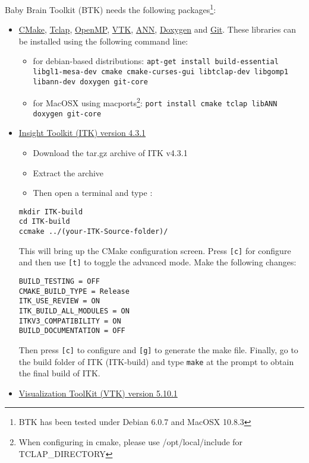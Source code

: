 \documentclass[a4paper,10pt]{article}
\begin{document}
Baby Brain Toolkit (BTK) needs the following packages\footnote{BTK has been tested under Debian 6.0.7 and MacOSX 10.8.3}:
\begin{itemize}
 \item \href{http://www.cmake.org}{CMake}, \href{http://tclap.sourceforge.net}{Tclap}, \href{http://openmp.org}{OpenMP}, \href{http://www.vtk.org}{VTK}, \href{http://www.cs.umd.edu/\string~mount/ANN}{ANN}, \href{http://www.doxygen.org}{Doxygen} and \href{http://git-scm.com/}{Git}. These libraries can be installed using the following command line:
 \begin{itemize}
 \item for debian-based distributions: \texttt{apt-get install build-essential libgl1-mesa-dev cmake cmake-curses-gui libtclap-dev libgomp1 libann-dev  doxygen git-core}
 \item for MacOSX using macports\footnote{When configuring in cmake, please use /opt/local/include for TCLAP\_DIRECTORY}: \texttt{port install cmake tclap libANN doxygen git-core}
 \end{itemize}
 \item \href{http://www.itk.org/ITK/resources/software.html}{Insight Toolkit (ITK) version 4.3.1}
 \begin{itemize}
 \item Download the tar.gz archive of ITK v4.3.1
 \item Extract the archive 
 \item Then open a terminal and type :
 \end{itemize}
\begin{verbatim}
mkdir ITK-build
cd ITK-build
ccmake ../(your-ITK-Source-folder)/
\end{verbatim}
This will bring up the CMake configuration screen. Press \texttt{[c]} for
configure and then use \texttt{[t]} to toggle the advanced mode. Make the
following changes:
\begin{verbatim}
BUILD_TESTING = OFF
CMAKE_BUILD_TYPE = Release
ITK_USE_REVIEW = ON
ITK_BUILD_ALL_MODULES = ON
ITKV3_COMPATIBILITY = ON
BUILD_DOCUMENTATION = OFF
\end{verbatim}
Then press \texttt{[c]} to configure and \texttt{[g]} to generate the make file.
Finally, go to the build folder of ITK (ITK-build) and type \texttt{make} at the prompt to obtain the final build of ITK.
   \item \href{http://www.vtk.org/VTK/resources/software.html#previous}{Visualization ToolKit (VTK) version 5.10.1 }
 \begin{itemize}

\end{itemize}
\end{itemize}
\end{document}
